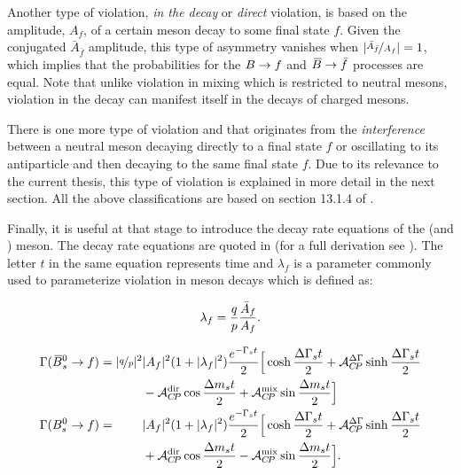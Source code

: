 Another type of \CP violation, {\it in the decay} or {\it direct} \CP violation, is based on the
amplitude, $A_f$, of a certain meson decay to some final state $f$. Given the \CP conjugated $\bar{A}_{\bar{f}}$
amplitude, this type of asymmetry vanishes when $|\nicefrac{\bar{A}_{\bar{f}}}{A_f}| = 1$,
which implies that the probabilities for the $B \rightarrow f$ and $\kern 0.18em\overline{\kern -0.18em B}{} \rightarrow \bar{f}$ processes are equal.
Note that unlike \CP violation in mixing which is restricted to neutral mesons,
\CP violation in the decay can manifest itself in the decays of charged mesons.

There is one more type of \CP violation and that originates from the {\it interference} between
a neutral meson decaying directly to a final state $f$ or oscillating to its antiparticle and then decaying
to the same final state $f$. Due to its relevance to the current thesis, this type of \CP violation is explained
in more detail in the next section. All the above classifications are based on section 13.1.4 of \cite{PDG}.

Finally, it is useful at that stage to introduce the decay rate equations of the \Bs (and \Bsb) meson.
The decay rate equations are quoted in  (for a full derivation see \cite{PDG,DeBruyn-thesis,jeroenThesis}).
The letter $t$ in the same equation represents time and $\lambda_f$ is a parameter commonly used to parameterize
\CP violation in meson decays which is defined as:

\begin{equation}
  \centering
  \lambda_{f} = \frac{q}{p} \frac{\bar{A}_f}{A_f}. %
\label{lambda_cpv}
\end{equation}

\newcommand{\ampSq}{\ensuremath{|A_f|^2}\xspace}
\newcommand{\ampBSq}{\ensuremath{|\bar{A}_f|^2}\xspace}
\newcommand{\lambSq}{\ensuremath{|\lambda_f|^2}\xspace}
\newcommand{\eGammast}{\ensuremath{e^{-\Gamma_s t}}\xspace}
\newcommand{\qopSq}{\ensuremath{|\qoverp|^2}\xspace}
\newcommand{\DeltaGammat}{\ensuremath{\frac{\Delta\Gamma_s t}{2}}\xspace}
\newcommand{\DeltaMt}{\ensuremath{\frac{\Delta m_s t}{2}}\xspace}

\begin{subequations}
 \label{decay_rate_master_eqs}
 \begin{align}
 \centering
    \Gamma(\Bsb \to f) =          \qopSq & \ampSq (1+\lambSq) \frac{\eGammast}{2} \Big[ \cosh\DeltaGammat + \Acp{\Delta\Gamma}\sinh\DeltaGammat \nonumber \\
                                         &  - \Acp{\rm dir}\cos\DeltaMt + \Acp{\rm mix}\sin\DeltaMt \Big]  \\
    \Gamma(\Bs \to f) = \phantom{\qopSq} & \ampSq (1+\lambSq) \frac{\eGammast}{2} \Big[ \cosh\DeltaGammat + \Acp{\Delta\Gamma}\sinh\DeltaGammat \nonumber  \\
                                         & + \Acp{\rm dir}\cos\DeltaMt - \Acp{\rm mix}\sin\DeltaMt \Big].
 \end{align}
\end{subequations}


